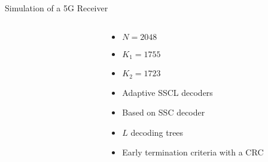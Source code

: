 \begin{frame}{Simulation of a 5G Receiver}
\begin{columns}
\begin{column}[T]{8cm}
\begin{figure}[!h]
{
    }
  \end{figure}
  \end{column}
  \begin{column}[T]{4cm}
    \vspace{0.2cm}
    \begin{itemize}
      \item $N = 2048$
      \item $K_1 = 1755$
      \item $K_2 = 1723$
      \vspace{0.3cm}
      \item Adaptive SSCL decoders
      \item Based on SSC decoder
      \item $L$ decoding trees
      \item<3-> Early termination criteria with a CRC
    \end{itemize}
  \end{column}
  \end{columns}
\end{frame}

